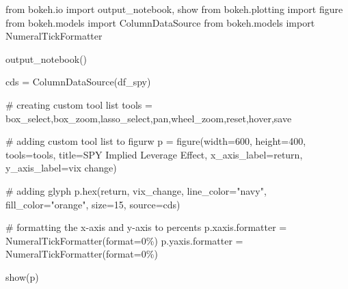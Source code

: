 \documentclass[
  letterpaper,
  DIV=11,
  numbers=noendperiod]{scrreprt}
\newenvironment{Shaded}{\begin{snugshade}}{\end{snugshade}}
\newcommand{\BuiltInTok}[1]{\textcolor[rgb]{0.00,0.23,0.31}{#1}}
\newcommand{\CommentTok}[1]{\textcolor[rgb]{0.37,0.37,0.37}{#1}}
\newcommand{\DecValTok}[1]{\textcolor[rgb]{0.68,0.00,0.00}{#1}}
\newcommand{\ImportTok}[1]{\textcolor[rgb]{0.00,0.46,0.62}{#1}}
\newcommand{\NormalTok}[1]{\textcolor[rgb]{0.00,0.23,0.31}{#1}}
\newcommand{\OperatorTok}[1]{\textcolor[rgb]{0.37,0.37,0.37}{#1}}
\newcommand{\StringTok}[1]{\textcolor[rgb]{0.13,0.47,0.30}{#1}}
\begin{document}
\begin{Shaded}
\begin{Highlighting}[]
\ImportTok{from}\NormalTok{ bokeh.io }\ImportTok{import}\NormalTok{ output\_notebook, show}
\ImportTok{from}\NormalTok{ bokeh.plotting }\ImportTok{import}\NormalTok{ figure}
\ImportTok{from}\NormalTok{ bokeh.models }\ImportTok{import}\NormalTok{ ColumnDataSource}
\ImportTok{from}\NormalTok{ bokeh.models }\ImportTok{import}\NormalTok{ NumeralTickFormatter}

\NormalTok{output\_notebook()}

\NormalTok{cds }\OperatorTok{=}\NormalTok{ ColumnDataSource(df\_spy)}

\CommentTok{\# creating custom tool list}
\NormalTok{tools }\OperatorTok{=} \StringTok{\textquotesingle{}box\_select,box\_zoom,lasso\_select,pan,wheel\_zoom,reset,hover,save\textquotesingle{}}

\CommentTok{\# adding custom tool list to figurw}
\NormalTok{p }\OperatorTok{=}\NormalTok{ figure(width}\OperatorTok{=}\DecValTok{600}\NormalTok{, height}\OperatorTok{=}\DecValTok{400}\NormalTok{, tools}\OperatorTok{=}\NormalTok{tools, title}\OperatorTok{=}\StringTok{\textquotesingle{}SPY Implied Leverage Effect\textquotesingle{}}\NormalTok{,}
\NormalTok{           x\_axis\_label}\OperatorTok{=}\StringTok{\textquotesingle{}return\textquotesingle{}}\NormalTok{, y\_axis\_label}\OperatorTok{=}\StringTok{\textquotesingle{}vix change\textquotesingle{}}\NormalTok{)}

\CommentTok{\# adding glyph}
\NormalTok{p.}\BuiltInTok{hex}\NormalTok{(}\StringTok{\textquotesingle{}return\textquotesingle{}}\NormalTok{, }\StringTok{\textquotesingle{}vix\_change\textquotesingle{}}\NormalTok{, line\_color}\OperatorTok{=}\StringTok{"navy"}\NormalTok{, fill\_color}\OperatorTok{=}\StringTok{"orange"}\NormalTok{, size}\OperatorTok{=}\DecValTok{15}\NormalTok{, source}\OperatorTok{=}\NormalTok{cds)}

\CommentTok{\# formatting the x{-}axis and y{-}axis to percents}
\NormalTok{p.xaxis.formatter }\OperatorTok{=}\NormalTok{ NumeralTickFormatter(}\BuiltInTok{format}\OperatorTok{=}\StringTok{\textquotesingle{}0\%\textquotesingle{}}\NormalTok{) }
\NormalTok{p.yaxis.formatter }\OperatorTok{=}\NormalTok{ NumeralTickFormatter(}\BuiltInTok{format}\OperatorTok{=}\StringTok{\textquotesingle{}0\%\textquotesingle{}}\NormalTok{)}

\NormalTok{show(p)}
\end{Highlighting}
\end{Shaded}
\end{document}
